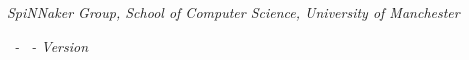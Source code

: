 \documentclass[11pt,a4paper]{article}
\def\TitleA{SpiNNaker Group, School of Computer Science,
    University of Manchester}
\def\TitleB{\Author\ - \Date\ - Version \Version}
\def\Title{AppNote \NoteNum\ - \FullTitle}
\def\Title{\FullTitle}
\begin{document}
\begin{center}
\setlength{\parskip}{0em}
{\Large\bfseries\Title}
\par
\vspace{5mm}
{\large\itshape\TitleA}
\par
\vspace{2mm}
{\large\itshape\TitleB}
\ifdefined\TitleC
\par
\vspace{2mm}
{\large\itshape\TitleC}
\fi
\end{center}
\end{document}
